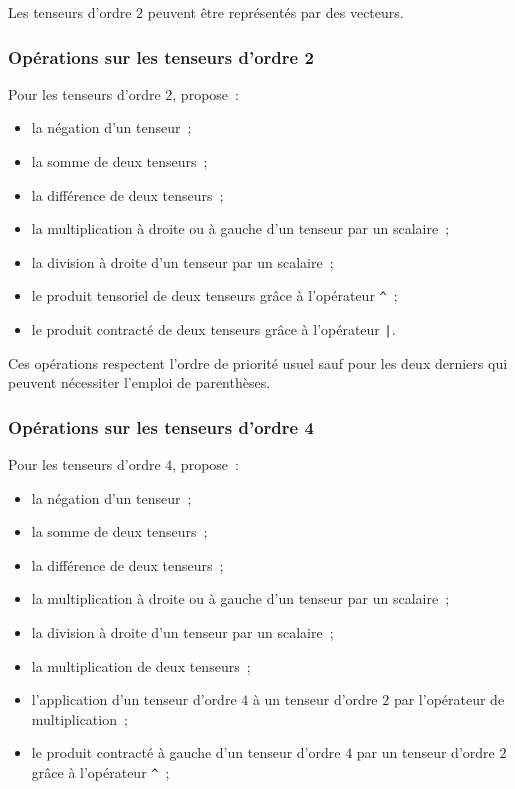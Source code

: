 \documentclass[rectoverso,pleiades,pstricks,leqno,anti]{texmf/note_technique_2010}
\newcommand{\tfel}[1]{\index{tfel}{#1}{\texttt{#1}}}
\begin{document}
Les tenseurs d'ordre \(2\) peuvent être représentés par des vecteurs.

\subsubsection{Opérations sur les tenseurs d'ordre 2}

Pour les tenseurs d'ordre \(2\), \tfel{} propose~:
\begin{itemize}
\item la négation d'un tenseur~;
\item la somme de deux tenseurs~;
\item la différence de deux tenseurs~;
\item la multiplication à droite ou à gauche d'un tenseur par un scalaire~;
\item la division à droite d'un tenseur par un scalaire~;
\item le produit tensoriel de deux tenseurs grâce à l'opérateur \texttt{\^}~;
\item le produit contracté de deux tenseurs grâce à l'opérateur \texttt{|}.
\end{itemize}

Ces opérations respectent l'ordre de priorité usuel sauf pour les deux
derniers qui peuvent nécessiter l'emploi de parenthèses.

\subsubsection{Opérations sur les tenseurs d'ordre 4}

Pour les tenseurs d'ordre \(4\), \tfel{} propose~:
\begin{itemize}
\item la négation d'un tenseur~;
\item la somme de deux tenseurs~;
\item la différence de deux tenseurs~;
\item la multiplication à droite ou à gauche d'un tenseur par un scalaire~;
\item la division à droite d'un tenseur par un scalaire~;
\item la multiplication de deux tenseurs~;
\item l'application d'un tenseur d'ordre \(4\) à un tenseur d'ordre
  \(2\) par l'opérateur de multiplication~;
\item le produit contracté à gauche d'un tenseur d'ordre \(4\) par un
  tenseur d'ordre \(2\) grâce à l'opérateur \texttt{\^}~;
\end{itemize}
\end{document}
